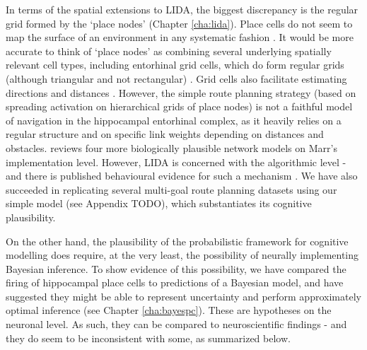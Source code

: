 In terms of the spatial extensions to LIDA, the biggest discrepancy is the regular grid formed by the `place nodes' (Chapter \ref{cha:lida}). Place cells do not seem to map the surface of an environment in any systematic fashion \citep{o1998place}. It would be more accurate to think of `place nodes' as combining several underlying spatially relevant cell types, including entorhinal grid cells, which do form regular grids (although triangular and not rectangular) \citep{moser2008place}. Grid cells also facilitate estimating directions and distances \citep{bush2015using}. However, the simple route planning strategy (based on spreading activation on hierarchical grids of place nodes) is not a faithful model of navigation in the hippocampal entorhinal complex, as it heavily relies on a regular structure and on specific link weights depending on distances and obstacles. \cite{bush2015using} reviews four more biologically plausible network models on Marr's implementation level. However, LIDA is concerned with the algorithmic level - and there is published behavioural evidence for such a mechanism \citep{mueller2013pathfinding}. We have also succeeded in replicating several multi-goal route planning datasets using our simple model (see Appendix TODO), which substantiates its cognitive plausibility. 

On the other hand, the plausibility of the probabilistic framework for cognitive modelling does require, at the very least, the possibility of neurally implementing Bayesian inference. To show evidence of this possibility, we have compared the firing of hippocampal place cells to predictions of a Bayesian model, and have suggested they might be able to represent uncertainty and perform approximately optimal inference (see Chapter \ref{cha:bayespc}). These are hypotheses on the neuronal level. As such, they can be compared to neuroscientific findings - and they do seem to be inconsistent with some, as summarized below.

